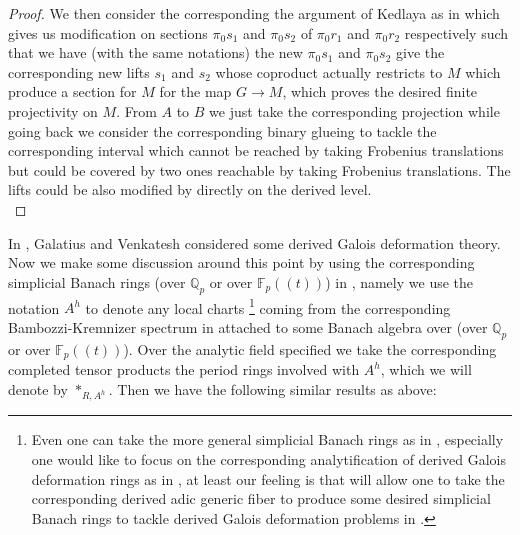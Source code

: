 \documentclass[12pt]{amsart}
\theoremstyle{definition}
\numberwithin{equation}{section}
\begin{document}
\begin{proof}
We then consider the corresponding the argument of Kedlaya as in \cite[Proposition 5.11]{XT3} which gives us modification on sections $\pi_0s_1$ and $\pi_0 s_2$ of $\pi_0 r_1$ and $\pi_0 r_2$ respectively such that we have (with the same notations) the new $\pi_0 s_1$ and $\pi_0 s_2$ give the corresponding new lifts $s_1$ and $s_2$ whose coproduct actually restricts to $M$ which produce a section for $M$ for the map $G\rightarrow M$, which proves the desired finite projectivity on $M$. From $A$ to $B$ we just take the corresponding projection while going back we consider the corresponding binary glueing to tackle the corresponding interval which cannot be reached by taking Frobenius translations but could be covered by two ones reachable by taking Frobenius translations. The lifts could be also modified by directly on the derived level.\\
\end{proof}


\indent In \cite{GV}, Galatius and Venkatesh considered some derived Galois deformation theory. Now we make some discussion around this point by using the corresponding simplicial Banach rings (over $\mathbb{Q}_p$ or over $\mathbb{F}_p((t))$) in \cite{BK1}, namely we use the notation $A^h$ to denote any local charts \footnote{Even one can take the more general simplicial Banach rings as in \cite{BBBK}, especially one would like to focus on the corresponding analytification of derived Galois deformation rings as in \cite{GV}, at least our feeling is that \cite{BBBK} will allow one to take the corresponding derived adic generic fiber to produce some desired simplicial Banach rings to tackle derived Galois deformation problems in \cite{GV}.} coming from the corresponding Bambozzi-Kremnizer spectrum in \cite{BK1} attached to some Banach algebra over (over $\mathbb{Q}_p$ or over $\mathbb{F}_p((t))$). Over the analytic field specified we take the corresponding completed tensor products the period rings involved with $A^h$, which we will denote by $*_{R,A^h}$. Then we have the following similar results as above:
\end{document}
